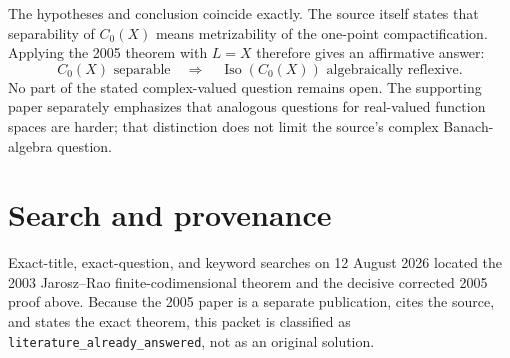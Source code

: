 \documentclass[10pt]{article}
\begin{document}
The hypotheses and conclusion coincide exactly.  The source itself states
that separability of $C_0(X)$ means metrizability of the one-point
compactification.  Applying the 2005 theorem with $L=X$ therefore gives an
affirmative answer:
\[
 C_0(X)\text{ separable}
 \quad\Longrightarrow\quad
 \operatorname{Iso}(C_0(X))\text{ algebraically reflexive}.
\]
No part of the stated complex-valued question remains open.  The supporting
paper separately emphasizes that analogous questions for real-valued
function spaces are harder; that distinction does not limit the source's
complex Banach-algebra question.

\section*{Search and provenance}

Exact-title, exact-question, and keyword searches on 12 August 2026 located
the 2003 Jarosz--Rao finite-codimensional theorem and the decisive corrected
2005 proof above.  Because the 2005 paper is a separate publication, cites
the source, and states the exact theorem, this packet is classified as
\texttt{literature\_already\_answered}, not as an original solution.
\end{document}
